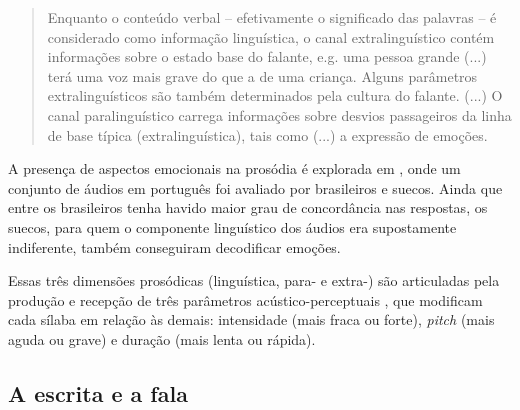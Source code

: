 \documentclass[a4paper]{tufte-handout}
\begin{document}
\begin{quotation}
    Enquanto o conteúdo verbal -- efetivamente o significado das palavras -- é considerado como informação linguística, o canal extralinguístico contém informações sobre o estado base do falante, e.g. uma pessoa grande (...) terá uma voz mais grave do que a de uma criança. Alguns parâmetros extralinguísticos são também determinados pela cultura do falante. (...) O canal paralinguístico carrega informações sobre desvios passageiros da linha de base típica (extralinguística), tais como (...) a expressão de emoções. 
\end{quotation}

A presença de aspectos emocionais na prosódia é explorada em \citet{SILVA2016}, onde um conjunto de áudios em português foi avaliado por brasileiros e suecos. Ainda que entre os brasileiros tenha havido maior grau de concordância nas respostas, os suecos, para quem o componente linguístico dos áudios era supostamente indiferente, também conseguiram decodificar emoções.

Essas três dimensões prosódicas (linguística, para- e extra-) são articuladas pela produção e recepção de três parâmetros acústico-perceptuais , que modificam cada sílaba em relação às demais: intensidade (mais fraca ou forte), \textit{pitch} (mais aguda ou grave) e duração (mais lenta ou rápida).

\subsection{A escrita e a fala}
\end{document}
